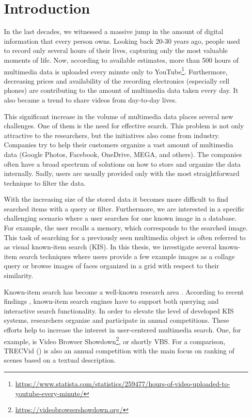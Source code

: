 \chapter*{Introduction}

In the last decades, we witnessed a massive jump in the amount of digital information that every person owns. Looking back 20-30 years ago, people used to record only several hours of their lives, capturing only the most valuable moments of life. Now, according to available estimates, more than 500 hours of multimedia data is uploaded every minute only to YouTube\footnote{\url{https://www.statista.com/statistics/259477/hours-of-video-uploaded-to-youtube-every-minute/}}. Furthermore, decreasing prices and availability of the recording electronics (especially cell phones) are contributing to the amount of multimedia data taken every day. It also became a trend to share videos from day-to-day lives.

This significant increase in the volume of multimedia data places several new challenges. One of them is the need for effective search. This problem is not only attractive to the researchers, but the initiatives also come from industry. Companies try to help their customers organize a vast amount of multimedia data (Google Photos, Facebook, OneDrive, MEGA, and others). The companies often have a broad spectrum of solutions on how to store and organize the data internally. Sadly, users are usually provided only with the most straightforward technique to filter the data.

With the increasing size of the stored data it becomes more difficult to find searched items with a query or filter.
 Furthermore, we are interested in a specific challenging scenario where a user searches for one known image in a database. For example, the user recalls a memory, which corresponds to the searched image. This task of searching for a previously seen multimedia object is often referred to as visual known-item search (KIS). In this thesis, we investigate several known-item search techniques where users provide a few example images as a collage query or browse images of faces organized in a grid with respect to their similarity.

Known-item search has become a well-known research area \cite{8352047}. 
According to recent findings \cite{9037125}, known-item search engines have to support both querying and interactive search functionality.
In order to elevate the level of developed KIS systems, researchers organize and participate in annual competitions. These efforts help to increase the interest in user-centered multimedia search. One, for example, is Video Browser Showdown\footnote{\url{https://videobrowsershowdown.org/}}, or shortly VBS. For a comparison, TRECVid (\cite{2019trecvidawad}) is also an annual competition with the main focus on ranking of scenes based on a textual description.

